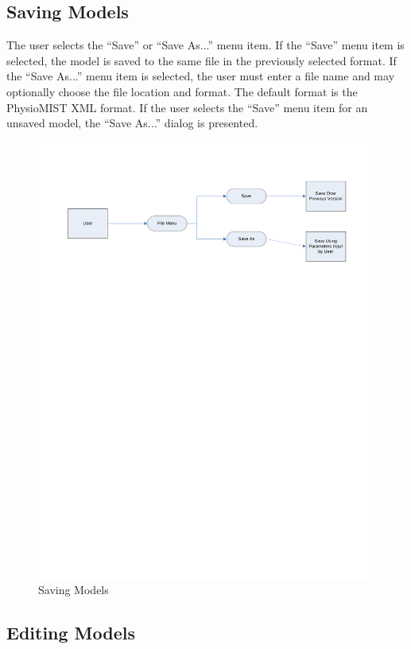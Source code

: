 \documentclass{article}
\begin{document}
\subsection{Saving Models}
The user selects the ``Save'' or ``Save As...'' menu item. If the ``Save'' menu item is selected, the model is saved to the same file in the previously selected format. If the ``Save As...'' menu item is selected, the user must enter a file name and may optionally choose the file location and format. The default format is the PhysioMIST XML format. If the user selects the ``Save'' menu item for an unsaved model, the ``Save As...'' dialog is presented.
\begin{figure}[!htb]
\centering
\includegraphics[width=\textwidth]{./diagrams/save}
\caption{Saving Models}
\end{figure}
\subsection{Editing Models}
\end{document}
